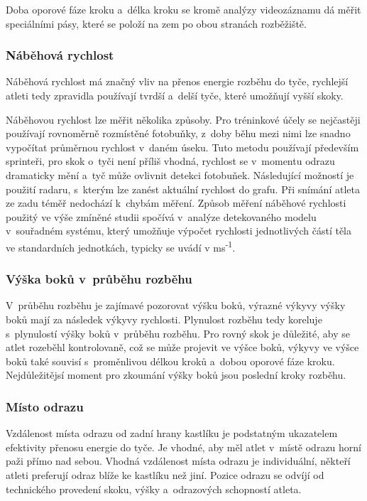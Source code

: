 Doba oporové fáze kroku a~délka kroku se kromě analýzy videozáznamu dá měřit speciálními pásy, které se položí na zem po obou stranách rozběžiště.

\subsubsection{Náběhová rychlost}

Náběhová rychlost má značný vliv na přenos energie rozběhu do tyče, rychlejší atleti tedy zpravidla používají tvrdší a~delší tyče, které umožňují vyšší skoky.

Náběhovou rychlost lze měřit několika způsoby. Pro tréninkové účely se nejčastěji používají rovnoměrně rozmístěné fotobuňky, z~doby běhu mezi nimi lze snadno vypočítat průměrnou rychlost v~daném úseku. Tuto metodu používají především sprinteři, pro skok o~tyči není příliš vhodná, rychlost se v~momentu odrazu dramaticky mění a~tyč může ovlivnit detekci fotobuňek. Následující možností je použití radaru, s~kterým lze zanést aktuální rychlost do grafu. Při snímání atleta ze zadu téměř nedochází k~chybám měření. Způsob měření náběhové rychlosti použitý ve výše zmíněné studii \citep{IAAF2017} spočívá v~analýze detekovaného modelu v~souřadném systému, který umožňuje výpočet rychlosti jednotlivých částí těla ve standardních jednotkách, typicky se uvádí v ms\textsuperscript{-1}.

\subsubsection{Výška boků v~průběhu rozběhu}

V~průběhu rozběhu je zajímavé pozorovat výšku boků, výrazné výkyvy výšky boků mají za následek výkyvy rychlosti. Plynulost rozběhu tedy koreluje s~plynulostí výšky boků v~průběhu rozběhu. Pro rovný skok je důležité, aby se atlet rozeběhl kontrolovaně, což se může projevit ve výšce boků, výkyvy ve výšce boků také souvisí s~proměnlivou délkou kroků a~dobou oporové fáze kroku. Nejdůležitějsí moment pro zkoumání výšky boků jsou poslední kroky rozběhu.

\subsubsection{Místo odrazu}

Vzdálenost místa odrazu od zadní hrany kastlíku je podstatným ukazatelem efektivity přenosu energie do tyče. Je vhodné, aby měl atlet v~místě odrazu horní paži přímo nad sebou. Vhodná vzdálenost místa odrazu je individuální, někteří atleti preferují odraz blíže ke kastlíku než jiní. Pozice odrazu se odvíjí od technického provedení skoku, výšky a~odrazových schopností atleta.

